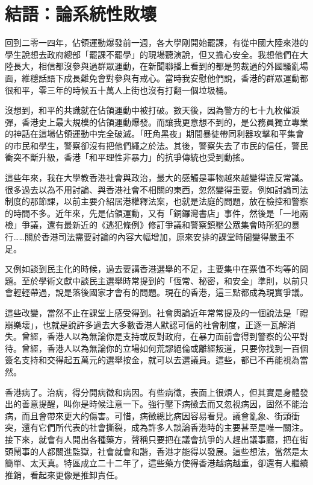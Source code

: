 \chapter{結語：論系統性敗壞}

回到二零一四年，佔領運動爆發前一週，各大學剛開始罷課，有從中國大陸來港的學生說想去政府總部「罷課不罷學」的現場聽演說，但又擔心安全。我想他們在大陸長大，相信都沒參與過群眾運動，在新聞聯播上看到的都是剪裁過的外國騷亂場面，維穩話語下成長難免會對參與有戒心。當時我安慰他們說，香港的群眾運動都很和平，零三年的時候五十萬人上街也沒有打翻一個垃圾桶。

沒想到，和平的共識就在佔領運動中被打破。數天後，因為警方的七十九枚催淚彈，香港史上最大規模的佔領運動爆發。而讓我更意想不到的，是公務員獨立專業的神話在這場佔領運動中完全破滅。「旺角黑夜」期間暴徒帶同利器攻擊和平集會的市民和學生，警察卻沒有把他們繩之於法。其後，警察失去了市民的信任，警民衝突不斷升級，香港「和平理性非暴力」的抗爭傳統也受到動搖。

這些年來，我在大學教香港社會與政治，最大的感觸是事物越來越變得違反常識。很多過去以為不用討論、與香港社會不相關的東西，忽然變得重要。例如討論司法制度的那節課，以前主要介紹居港權釋法案，也就是法庭的問題，放在檢控和警察的時間不多。近年來，先是佔領運動，又有「銅鑼灣書店」事件，然後是「一地兩檢」爭議，還有最新近的《逃犯條例》修訂爭議和警察鎮壓公眾集會時所犯的暴行……關於香港司法需要討論的內容大幅增加，原來安排的課堂時間變得嚴重不足。

又例如談到民主化的時候，過去要講香港選舉的不足，主要集中在票值不均等的問題。至於學術文獻中談民主選舉時常提到的「恆常、秘密，和安全」準則，以前只會輕輕帶過，說是落後國家才會有的問題。現在的香港，這三點都成為現實爭議。

這些改變，當然不止在課堂上感受得到。社會輿論近年常常提及的一個說法是「禮崩樂壞」，也就是說許多過去大多數香港人默認可信的社會制度，正逐一瓦解消失。曾經，香港人以為無論你是支持或反對政府，在暴力面前會得到警察的公平對待。曾經，香港人以為無論你的立場如何荒謬絕倫或離經叛道，只要你找到一百個簽名支持和交得起五萬元的選舉按金，就可以去選議員。這些，都已不再能視為當然。

香港病了。治病，得分開病徵和病因。有些病徵，表面上很煩人，但其實是身體發出的善意提醒，叫你是時候注意一下。強行壓下病徵去而又忽視病因，固然不能治病，而且會帶來更大的傷害。可惜，病徵總比病因容易看見。議會亂象、街頭衝突，還有它們所代表的社會撕裂，成為許多人談論香港時的主要甚至是唯一關注。接下來，就會有人開出各種藥方，聲稱只要把在議會抗爭的人趕出議事廳，把在街頭鬧事的人都關進監獄，社會就會和諧，香港才能得以發展。這些想法，當然是太簡單、太天真。特區成立二十二年了，這些藥方使得香港越病越重，卻還有人繼續推銷，看起來更像是推卸責任。

